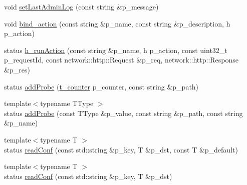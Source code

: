 \begin{DoxyCompactItemize}
\item 
void \hyperlink{classxtd_1_1servers_1_1app_1_1HttpServer_a9247cbc7930939b40df98a20167007c3}{set\-Last\-Admin\-Log} (const string \&p\-\_\-message)
\item 
void \hyperlink{classxtd_1_1servers_1_1app_1_1HttpServer_a981ab09b5f746a0cb7372816aede1115}{bind\-\_\-action} (const string \&p\-\_\-name, const string \&p\-\_\-description, h p\-\_\-action)
\item 
status \hyperlink{classxtd_1_1servers_1_1app_1_1HttpServer_a89a77d0dd8391a54b9560d2a32ab5ec6}{h\-\_\-run\-Action} (const string \&p\-\_\-name, h p\-\_\-action, const uint32\-\_\-t p\-\_\-request\-Id, const network\-::http\-::\-Request \&p\-\_\-req, network\-::http\-::\-Response \&p\-\_\-res)
\item 
status \hyperlink{classxtd_1_1servers_1_1app_1_1HttpServer_a0ff20a40a0e31dbb1e82be87be0e255f}{add\-Probe} (\hyperlink{classxtd_1_1servers_1_1app_1_1HttpServer_aaef467afe1f5191f38758088615c09c0}{t\-\_\-counter} p\-\_\-counter, const string \&p\-\_\-path)
\item 
{\footnotesize template$<$typename T\-Type $>$ }\\status \hyperlink{classxtd_1_1servers_1_1app_1_1HttpServer_a6126daf3a088048921d4e809231c3716}{add\-Probe} (const T\-Type \&p\-\_\-value, const string \&p\-\_\-path, const string \&p\-\_\-name)
\item 
{\footnotesize template$<$typename T $>$ }\\status \hyperlink{classxtd_1_1servers_1_1app_1_1HttpServer_ae1cffd988b56081fba6f124e9f0743fd}{read\-Conf} (const std\-::string \&p\-\_\-key, T \&p\-\_\-dst, const T \&p\-\_\-default)
\item 
{\footnotesize template$<$typename T $>$ }\\status \hyperlink{classxtd_1_1servers_1_1app_1_1HttpServer_abe54ee996274b1f6d4a89d29bba56ae8}{read\-Conf} (const std\-::string \&p\-\_\-key, T \&p\-\_\-dst)
\end{DoxyCompactItemize}
